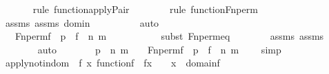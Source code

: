 \begin{isabellebody}
\ \ \ \ \ \ \isamarkupfalse%
{\isacharparenleft}{\kern0pt}rule\ function{\isacharunderscore}{\kern0pt}apply{\isacharunderscore}{\kern0pt}Pair{\isacharparenright}{\kern0pt}\isanewline
\ \ \ \ \ \ \ \isamarkupfalse%
{\isacharparenleft}{\kern0pt}rule\ function{\isacharunderscore}{\kern0pt}Fn{\isacharunderscore}{\kern0pt}perm{\isacharparenright}{\kern0pt}\isanewline
\ \ \ \ \ \ \isamarkupfalse%
\ assms{}\ assms\ domin\isanewline
\ \ \ \ \ \ \ \ \isamarkupfalse%
\ auto{\isacharbrackleft}{\kern0pt}{}{\isacharbrackright}{\kern0pt}\isanewline
\ \ \ \ \ \ \isamarkupfalse%
\isanewline
\ \ \ \ \isamarkupfalse%
\ \isamarkupfalse%
\ {\isachardoublequoteopen}{\isachardot}{\kern0pt}{\isachardot}{\kern0pt}{\isachardot}{\kern0pt}\ {\isasymlongleftrightarrow}\ Fn{\isacharunderscore}{\kern0pt}perm{\isacharprime}{\kern0pt}{\isacharparenleft}{\kern0pt}f{\isacharparenright}{\kern0pt}\ {\isacharbackquote}{\kern0pt}\ p\ {\isacharbackquote}{\kern0pt}\ {\isasymlangle}f\ {\isacharbackquote}{\kern0pt}\ n{\isacharcomma}{\kern0pt}\ m{\isasymrangle}\ {\isacharequal}{\kern0pt}\ {}{\isachardoublequoteclose}\ \ \isanewline
\ \ \ \ \ \ \isamarkupfalse%
{\isacharparenleft}{\kern0pt}subst\ Fn{\isacharunderscore}{\kern0pt}perm{\isacharprime}{\kern0pt}{\isacharunderscore}{\kern0pt}eq{\isacharparenright}{\kern0pt}\isanewline
\ \ \ \ \ \ \isamarkupfalse%
\ assms\ assms{}\isanewline
\ \ \ \ \ \ \isamarkupfalse%
\ auto\isanewline
\ \ \ \ \isamarkupfalse%
\ \isamarkupfalse%
\ {\isachardoublequoteopen}p\ {\isacharbackquote}{\kern0pt}\ {\isasymlangle}n{\isacharcomma}{\kern0pt}\ m{\isasymrangle}\ {\isacharequal}{\kern0pt}\ {}\ {\isasymlongleftrightarrow}\ Fn{\isacharunderscore}{\kern0pt}perm{\isacharprime}{\kern0pt}{\isacharparenleft}{\kern0pt}f{\isacharparenright}{\kern0pt}\ {\isacharbackquote}{\kern0pt}\ p\ {\isacharbackquote}{\kern0pt}\ {\isasymlangle}f\ {\isacharbackquote}{\kern0pt}\ n{\isacharcomma}{\kern0pt}\ m{\isasymrangle}\ {\isacharequal}{\kern0pt}\ {}{\isachardoublequoteclose}\ \isamarkupfalse%
\ simp\isanewline
\ \ \isamarkupfalse%
\isanewline
\isanewline
\ \ \isamarkupfalse%
\ apply{\isacharunderscore}{\kern0pt}not{}{\isacharunderscore}{\kern0pt}indom\ {\isacharcolon}{\kern0pt}\ {\isachardoublequoteopen}{\isasymAnd}f\ x{\isachardot}{\kern0pt}\ function{\isacharparenleft}{\kern0pt}f{\isacharparenright}{\kern0pt}\ {\isasymLongrightarrow}\ f{\isacharbackquote}{\kern0pt}x\ {\isasymnoteq}\ {}\ {\isasymLongrightarrow}\ x\ {\isasymin}\ domain{\isacharparenleft}{\kern0pt}f{\isacharparenright}{\kern0pt}{\isachardoublequoteclose}\ \isanewline

\end{isabellebody}
